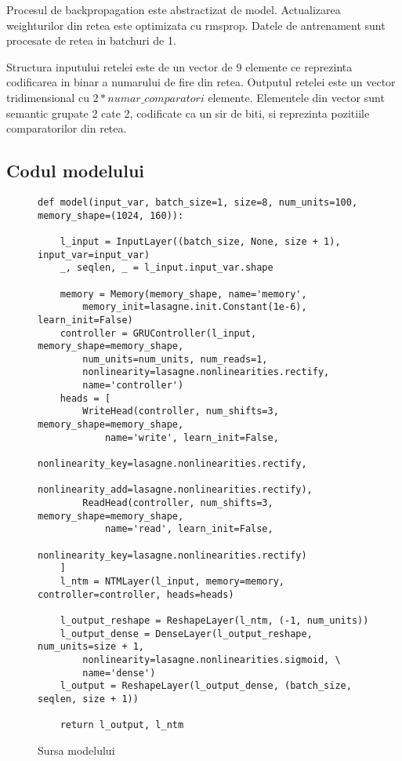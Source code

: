\documentclass[12pt]{article}
\begin{document}
Procesul de backpropagation este abstractizat de model. Actualizarea weighturilor din retea este optimizata cu rmsprop.
Datele de antrenament sunt procesate de retea in batchuri de 1.

Structura inputului retelei este de un vector de 9 elemente ce reprezinta codificarea in binar a numarului de fire din retea. Outputul retelei este un vector tridimensional cu $2*numar\_comparatori$ elemente. Elementele din vector sunt semantic grupate 2 cate 2, codificate ca un sir de biti, si reprezinta pozitiile comparatorilor din retea. 

\subsection{Codul modelului}

\begin{figure}
\centering
\begin{lstlisting}
def model(input_var, batch_size=1, size=8, num_units=100, memory_shape=(1024, 160)):

    l_input = InputLayer((batch_size, None, size + 1), input_var=input_var)
    _, seqlen, _ = l_input.input_var.shape

    memory = Memory(memory_shape, name='memory', 
    	memory_init=lasagne.init.Constant(1e-6), learn_init=False)
    controller = GRUController(l_input, memory_shape=memory_shape,
        num_units=num_units, num_reads=1,
        nonlinearity=lasagne.nonlinearities.rectify,
        name='controller')
    heads = [
        WriteHead(controller, num_shifts=3, memory_shape=memory_shape, 
        	name='write', learn_init=False,
            nonlinearity_key=lasagne.nonlinearities.rectify,
            nonlinearity_add=lasagne.nonlinearities.rectify),
        ReadHead(controller, num_shifts=3, memory_shape=memory_shape, 
        	name='read', learn_init=False,
            nonlinearity_key=lasagne.nonlinearities.rectify)
    ]
    l_ntm = NTMLayer(l_input, memory=memory, controller=controller, heads=heads)

    l_output_reshape = ReshapeLayer(l_ntm, (-1, num_units))
    l_output_dense = DenseLayer(l_output_reshape, num_units=size + 1, 
    	nonlinearity=lasagne.nonlinearities.sigmoid, \
        name='dense')
    l_output = ReshapeLayer(l_output_dense, (batch_size, seqlen, size + 1))

    return l_output, l_ntm

\end{lstlisting}
\caption{Sursa modelului}
\end{figure}
\end{document}

